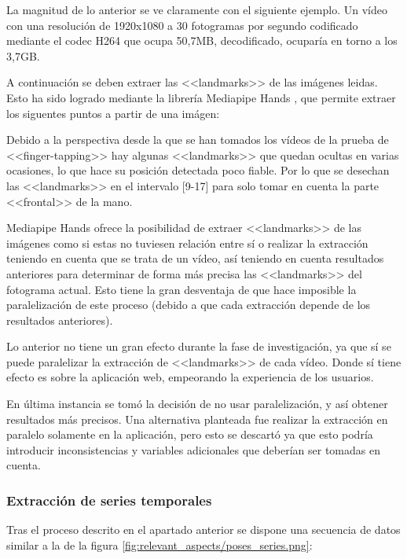 La magnitud de lo anterior se ve claramente con el siguiente ejemplo. Un vídeo
con una resolución de 1920x1080 a 30 fotogramas por segundo codificado mediante
el codec H264 que ocupa 50,7MB, decodificado, ocuparía en torno a los 3,7GB.

A continuación se deben extraer las <<landmarks>> de las imágenes leidas. Esto
ha sido logrado mediante la librería Mediapipe Hands \cite{zhang2020mediapipe},
que permite extraer los siguentes puntos a partir de una imágen:


Debido a la perspectiva desde la que se han tomados los vídeos de la prueba de
<<finger-tapping>> hay algunas <<landmarks>> que quedan ocultas en varias
ocasiones, lo que hace su posición detectada poco fiable. Por lo que se desechan
las <<landmarks>> en el intervalo [9-17] para solo tomar en cuenta la parte
<<frontal>> de la mano.

Mediapipe Hands ofrece la posibilidad de extraer <<landmarks>> de las imágenes
como si estas no tuviesen relación entre sí o realizar la extracción teniendo en
cuenta que se trata de un vídeo, así teniendo en cuenta resultados anteriores
para determinar de forma más precisa las <<landmarks>> del fotograma actual.
Esto tiene la gran desventaja de que hace imposible la paralelización de este
proceso (debido a que cada extracción depende de los resultados anteriores).

Lo anterior no tiene un gran efecto durante la fase de investigación, ya que sí
se puede paralelizar la extracción de <<landmarks>> de cada vídeo. Donde sí
tiene efecto es sobre la aplicación web, empeorando la experiencia de los
usuarios.

En última instancia se tomó la decisión de no usar paralelización, y así obtener
resultados más precisos. Una alternativa planteada fue realizar la extracción en
paralelo solamente en la aplicación, pero esto se descartó ya que esto podría
introducir inconsistencias y variables adicionales que deberían ser tomadas en
cuenta.

\subsubsection{Extracción de series temporales}

Tras el proceso descrito en el apartado anterior se dispone una secuencia de
datos similar a la de la figura \ref{fig:relevant_aspects/poses_series.png}:

